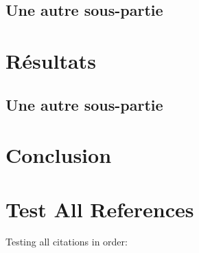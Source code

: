 \documentclass[11pt,a4paper]{article}
\begin{document}
\subsection{Une autre sous-partie}
\lipsum[2]

\newpage
\section{Résultats}
\subsection{Une autre sous-partie}
\lipsum[2]

\newpage
\section{Conclusion}


\lipsum[1]

\section{Test All References}
Testing all citations in order:
\end{document}
